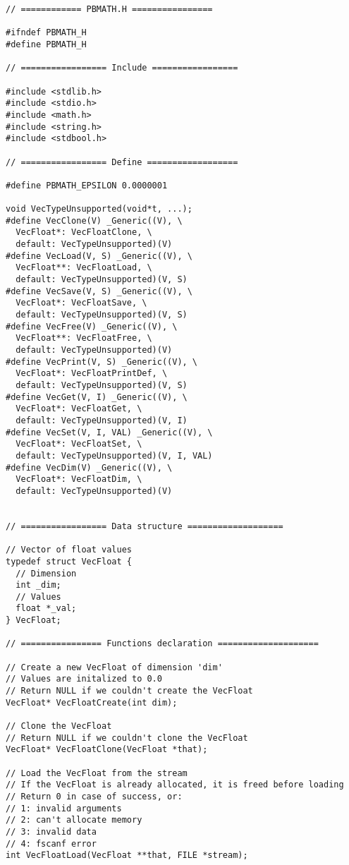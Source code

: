 \documentclass[12pt, a4paper]{article}
\begin{document}
\begin{scriptsize}
\begin{ttfamily}
\begin{lstlisting}
// ============ PBMATH.H ================

#ifndef PBMATH_H
#define PBMATH_H

// ================= Include =================

#include <stdlib.h>
#include <stdio.h>
#include <math.h>
#include <string.h>
#include <stdbool.h>

// ================= Define ==================

#define PBMATH_EPSILON 0.0000001

void VecTypeUnsupported(void*t, ...); 
#define VecClone(V) _Generic((V), \
  VecFloat*: VecFloatClone, \
  default: VecTypeUnsupported)(V)
#define VecLoad(V, S) _Generic((V), \
  VecFloat**: VecFloatLoad, \
  default: VecTypeUnsupported)(V, S)
#define VecSave(V, S) _Generic((V), \
  VecFloat*: VecFloatSave, \
  default: VecTypeUnsupported)(V, S)
#define VecFree(V) _Generic((V), \
  VecFloat**: VecFloatFree, \
  default: VecTypeUnsupported)(V)
#define VecPrint(V, S) _Generic((V), \
  VecFloat*: VecFloatPrintDef, \
  default: VecTypeUnsupported)(V, S)
#define VecGet(V, I) _Generic((V), \
  VecFloat*: VecFloatGet, \
  default: VecTypeUnsupported)(V, I)
#define VecSet(V, I, VAL) _Generic((V), \
  VecFloat*: VecFloatSet, \
  default: VecTypeUnsupported)(V, I, VAL)
#define VecDim(V) _Generic((V), \
  VecFloat*: VecFloatDim, \
  default: VecTypeUnsupported)(V)


// ================= Data structure ===================

// Vector of float values
typedef struct VecFloat {
  // Dimension
  int _dim;
  // Values
  float *_val;
} VecFloat;

// ================ Functions declaration ====================

// Create a new VecFloat of dimension 'dim'
// Values are initalized to 0.0
// Return NULL if we couldn't create the VecFloat
VecFloat* VecFloatCreate(int dim);

// Clone the VecFloat
// Return NULL if we couldn't clone the VecFloat
VecFloat* VecFloatClone(VecFloat *that);

// Load the VecFloat from the stream
// If the VecFloat is already allocated, it is freed before loading
// Return 0 in case of success, or:
// 1: invalid arguments
// 2: can't allocate memory
// 3: invalid data
// 4: fscanf error
int VecFloatLoad(VecFloat **that, FILE *stream);


\end{lstlisting}
\end{ttfamily}
\end{scriptsize}
\end{document}
